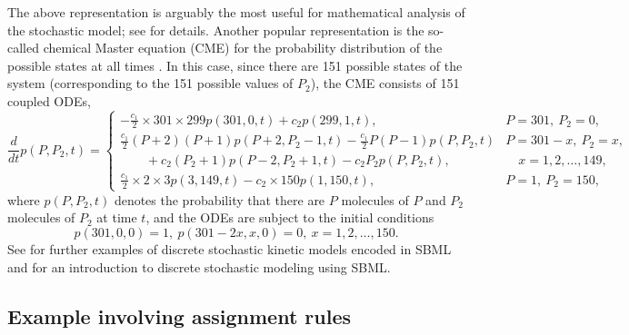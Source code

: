 The above representation is arguably the most useful for
mathematical analysis of the stochastic model; see \cite{ball:2006} for
details. Another popular representation is the so-called chemical
Master equation (CME) for the probability distribution of the possible
states at all times \citep{gillespie:1992}. In this case, since there are
151 possible states of the system (corresponding to the 151
possible values of $P_2$), the CME consists of 151 coupled
ODEs,
\[
\frac{d}{dt}p(P,P_2,t) =
\left\{
\begin{array}{ll}
\displaystyle-\frac{c_1}{2}\times 301\times 299p(301,0,t)+c_2p(299,1,t),
&P=301,\ P_2=0,\\[10pt]
\displaystyle\frac{c_1}{2}(P+2)(P+1)p(P+2,P_2-1,t)-\frac{c_1}{2}P(P-1)p(P,P_2,t)&P=301-x,\ P_2=x,\\[5pt]
\qquad+c_2(P_2+1)p(P-2,P_2+1,t)-c_2P_2p(P,P_2,t),
&\quad x=1,2,\ldots,149,\\[10pt]
\displaystyle\frac{c_1}{2}\times 2\times 3p(3,149,t)-c_2\times 150p(1,150,t),
&P=1,\ P_2=150,
\end{array}
\right.
\]
where $p(P,P_2,t)$ denotes the probability that there are $P$
molecules of $P$ and $P_2$ molecules of $P_2$ at time $t$, and the
ODEs are subject to the initial conditions
\[
p(301,0,0)=1,\ p(301-2x,x,0)=0,\ x=1,2,\ldots,150.
\]
See \cite{evans:2008} for further examples of discrete stochastic
kinetic models encoded in SBML and \cite{wilkinson_2006} for an
introduction to discrete stochastic modeling using SBML.



\subsection{Example involving assignment rules}
\label{apdx:rules-eg}

